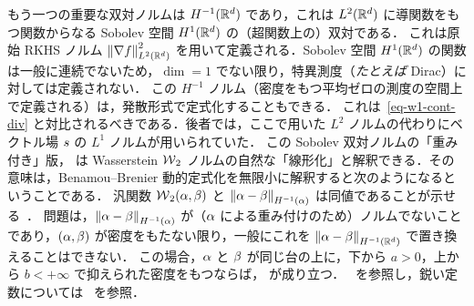 \begin{example}[$H^{-1}(\RR^\dim)$]\label{exp-sobolev-neg1}
もう一つの重要な双対ノルムは $H^{-1}(\RR^\dim)$ であり，これは $L^2(\mathbb{R}^d)$ に導関数をもつ関数からなる Sobolev 空間 $H^1(\mathbb{R}^d)$ の（超関数上の）双対である．
%
これは原始 RKHS ノルム $\left\| \nabla f \right\|_{L^2(\mathbb{R}^d)}^2$ を用いて定義される．Sobolev 空間 $H^1(\mathbb{R}^d)$ の関数は一般に連続でないため，$\dim=1$ でない限り，特異測度（\emph{たとえば} Dirac）に対しては定義されない．
%
この $H^{-1}$ ノルム（密度をもつ平均ゼロの測度の空間上で定義される）は，発散形式で定式化することもできる．
これは~\eqref{eq-w1-cont-div} と対比されるべきである．後者では，ここで用いた $L^2$ ノルムの代わりにベクトル場 $s$ の $L^1$ ノルムが用いられていた．
%
この Sobolev 双対ノルムの「重み付き」版，
は Wasserstein $\operatorname{\mathcal{W}}_2$ ノルムの自然な「線形化」と解釈できる．その意味は，Benamou--Brenier 動的定式化を無限小に解釈すると次のようになるということである．
汎関数 $\operatorname{\mathcal{W}}_2(\alpha,\beta)$ と $\left\| \alpha-\beta \right\|_{H^{-1}(\alpha)}$ は同値であることが示せる~\citep{peyre2011comparison}．
%
問題は，$\left\| \alpha-\beta \right\|_{H^{-1}(\alpha)}$ が（$\alpha$ による重み付けのため）ノルムでないことであり，$(\alpha,\beta)$ が密度をもたない限り，一般にこれを $\left\| \alpha-\beta \right\|_{H^{-1}(\mathbb{R}^d)}$ で置き換えることはできない．
%
この場合，$\alpha$ と $\beta$ が同じ台の上に，下から $a>0$，上から $b<+\infty$ で抑えられた密度をもつならば，
が成り立つ．~\citep[Theo. 5.34]{SantambrogioBook} を参照し，鋭い定数については~\citep{peyre2011comparison} を参照．
%
\end{example}

